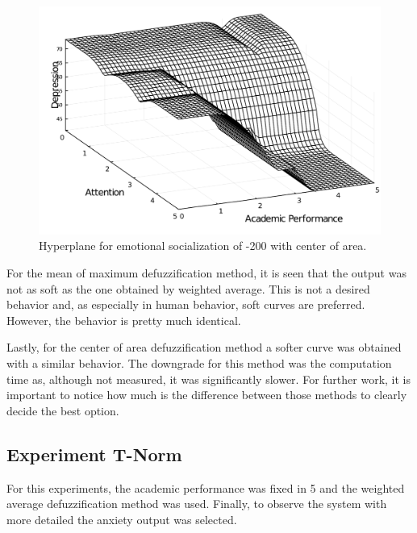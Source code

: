 \documentclass[conference]{IEEEtran}
\theoremstyle{definition}
\theoremstyle{remark}
\theoremstyle{remark}
\begin{document}
\begin{figure}[t]
  \centering
  \includegraphics[scale=.3]{figs/low_es_cog}
  \caption{Hyperplane for emotional socialization of -200 with center of area.}
  \label{fig:low_es_cog}
\end{figure}

For the mean of maximum defuzzification method, it is seen that the output was
not as soft as the one obtained by weighted average. This is not a desired
behavior and, as especially in human behavior, soft curves are preferred.
However, the behavior is pretty much identical.

Lastly, for the center of area defuzzification method a softer curve was
obtained with a similar behavior. The downgrade for this method was the
computation time as, although not measured, it was significantly slower. For
further work, it is important to notice how much is the difference between those
methods to clearly decide the best option.

\subsection{Experiment T-Norm}
For this experiments, the academic performance was fixed in 5 and the weighted
average defuzzification method was used. Finally, to observe the system with
more detailed the anxiety output was selected.
\end{document}

